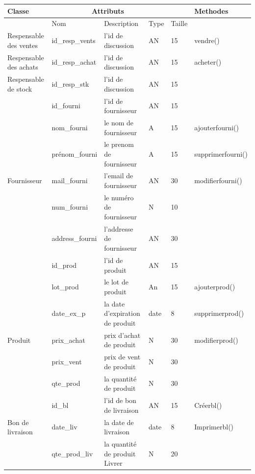 \documentclass[edit,12pt,a4paper,ChapStyle,oneside,doubleinterligne]{report}
\begin{document}
\begin{table}[H]
    \centering
    \begin{tabular}{ | m{} | m{}| m{3cm} |m{}|m{}|l|}
    \hline
         Classe&\multicolumn{3}{c}{Attributs}&\phantom{h} &Methodes\\
         \hline &Nom&Description&Type&Taille&\\\cline{2-5}
         Respensable des ventes  &id\_resp\_vents&l'id de discussion&AN&15&vendre() \\\hline
        Respensable des achats  &id\_resp\_achat&l'id de discussion&AN&15&acheter() \\\hline
         
        Respensable de stock    &id\_resp\_stk&l'id de discussion&AN&15& \\\hline


                    &id\_fourni    &l'id de fournisseur&AN&15& \\\cline{2-5}
                    &nom\_fourni   &le nom de fournisseur&A&15&ajouterfourni() \\\cline{2-5}
                    &prénom\_fourni&le prenom de fournisseur&A&15&supprimerfourni() \\\cline{2-5}
        Fournisseur &mail\_fourni  &l'email de fournisseur&AN&30&modifierfourni() \\\cline{2-5}
                    &num\_fourni   &le numéro de fournisseur&N&10&\\\cline{2-5}
                    &address\_fourni&l'addresse de fournisseur&AN&30&\\\hline

                    &id\_prod    &l'id de produit&AN&15& \\\cline{2-5}
                    &lot\_prod   &le lot de produit&An&15&ajouterprod() \\\cline{2-5}
                    &date\_ex\_p &la date d'expiration de produit&date&8&supprimerprod() \\\cline{2-5}
        Produit     &prix\_achat &prix d'achat de produit&N&30&modifierprod() \\\cline{2-5}
                    &prix\_vent  &prix de vent de produit&N&30&\\\cline{2-5}
                    &qte\_prod   &la quantité de produit&N&30&\\\hline

                    
                    &id\_bl &l'id de bon de livraison&AN&15& Créerbl()\\\cline{2-5}
    Bon de livraison&date\_liv &la date de livraison&date&8&Imprimerbl()\\\cline{2-5}
                    &qte\_prod\_liv&la quantité de produit Livrer&N&20&\\\hline
                    


\end{tabular}
\end{table}
\end{document}
